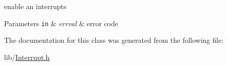 enable an interrupts 


\begin{DoxyParams}[1]{Parameters}
\mbox{\tt in}  & {\em errval} & error code \\
\hline
\end{DoxyParams}


The documentation for this class was generated from the following file\+:\begin{DoxyCompactItemize}
\item 
lib/\hyperlink{Interrupt_8h}{Interrupt.\+h}\end{DoxyCompactItemize}
